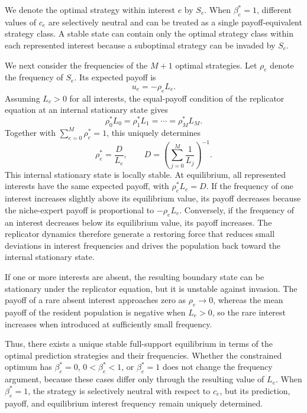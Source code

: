 \documentclass[12pt]{article}
\begin{document}
We denote the optimal strategy within interest $e$ by $S_e$. 
When $\beta_e^*=1$, different values of $c_e$ are selectively neutral and can be treated as a single payoff-equivalent strategy class. 
A stable state can contain only the optimal strategy class within each represented interest because a suboptimal strategy can be invaded by $S_e$.

We next consider the frequencies of the $M+1$ optimal strategies.
Let $\rho_e$ denote the frequency of $S_e$.
Its expected payoff is
\begin{equation}
u_e=-\rho_eL_e.
\end{equation}
Assuming $L_e>0$ for all interests, the equal-payoff condition of the replicator equation at an internal stationary state gives
\begin{equation}
\rho_0^*L_0 = \rho_1^*L_1 =\cdots = \rho_M^*L_M.
\end{equation}
Together with $\sum_{e=0}^{M}\rho_e^*=1$, this uniquely determines
\begin{equation}
\rho_e^* =\frac{D}{L_e},
\qquad D = \left(\sum_{j=0}^{M}\frac{1}{L_j}\right)^{-1}.
\end{equation}
This internal stationary state is locally stable.
At equilibrium, all represented interests have the same expected payoff, with $\rho_e^*L_e=D$.
If the frequency of one interest increases slightly above its equilibrium value, its payoff decreases because the niche-expert payoff is proportional to $-\rho_eL_e$.
Conversely, if the frequency of an interest decreases below its equilibrium value, its payoff increases.
The replicator dynamics therefore generate a restoring force that reduces small deviations in interest frequencies and drives the population back toward the internal stationary state.

If one or more interests are absent, the resulting boundary state can be stationary under the replicator equation, but it is unstable against invasion.
The payoff of a rare absent interest approaches zero as $\rho_e\to0$, whereas the mean payoff of the resident population is negative when $L_e>0$, so the rare interest increases when introduced at sufficiently small frequency.

Thus, there exists a unique stable full-support equilibrium in terms of the optimal prediction strategies and their frequencies.
Whether the constrained optimum has $\beta_e^*=0$, $0<\beta_e^*<1$, or $\beta_e^*=1$ does not change the frequency argument, because these cases differ only through the resulting value of $L_e$.
When $\beta_e^*=1$, the strategy is selectively neutral with respect to $c_e$, but its prediction, payoff, and equilibrium interest frequency remain uniquely determined.
\end{document}
